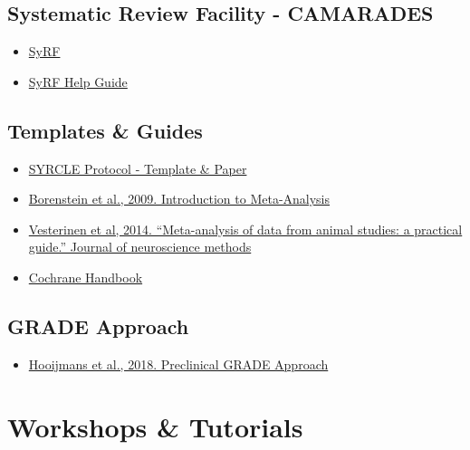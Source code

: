 \documentclass[
]{book}
\providecommand{\tightlist}{%
  \setlength{\itemsep}{0pt}\setlength{\parskip}{0pt}}
\begin{document}
\hypertarget{systematic-review-facility---camarades}{%
\section{Systematic Review Facility - CAMARADES}\label{systematic-review-facility---camarades}}

\begin{itemize}
\tightlist
\item
  \href{https://syrf.org.uk/}{SyRF}
\item
  \href{https://help.syrf.org.uk/}{SyRF Help Guide}
\end{itemize}

\hypertarget{templates-guides}{%
\section{Templates \& Guides}\label{templates-guides}}

\begin{itemize}
\tightlist
\item
  \href{https://onlinelibrary.wiley.com/doi/epdf/10.1002/ebm2.7}{SYRCLE Protocol - Template \& Paper}
\item
  \href{https://onlinelibrary.wiley.com/doi/book/10.1002/9780470743386}{Borenstein et al., 2009. Introduction to Meta-Analysis}
\item
  \href{https://doi.org/10.1016/j.jneumeth.2013.09.010}{Vesterinen et al, 2014. ``Meta-analysis of data from animal studies: a practical guide.'' Journal of neuroscience methods}
\item
  \href{https://training.cochrane.org/handbook/current}{Cochrane Handbook}
\end{itemize}

\hypertarget{grade-approach}{%
\section{GRADE Approach}\label{grade-approach}}

\begin{itemize}
\tightlist
\item
  \href{https://journals.plos.org/plosone/article?id=10.1371/journal.pone.0187271}{Hooijmans et al., 2018. Preclinical GRADE Approach}
\end{itemize}

\hypertarget{workshops}{%
\chapter{Workshops \& Tutorials}\label{workshops}}
\end{document}
